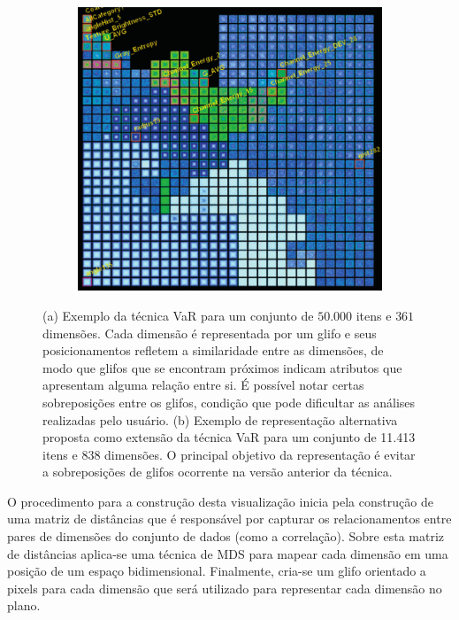 \begin{figure}[h!]
\begin{subfigure}[b]{0.475\textwidth}
    \includegraphics[width=\textwidth]{images/var2.png}
    \caption{}
    \label{fig:var2}
  \end{subfigure}
  \caption[VaR: Value and Relation]{(a) Exemplo da técnica VaR para um conjunto de $50.000$ itens e $361$ dimensões. Cada dimensão é representada por um glifo e seus posicionamentos refletem a similaridade entre as dimensões, de modo que glifos que se encontram próximos indicam atributos que apresentam alguma relação entre si. É possível notar certas sobreposições entre os glifos, condição que pode dificultar as análises realizadas pelo usuário. (b) Exemplo de representação alternativa proposta como extensão da técnica VaR para um conjunto de 11.413 itens e 838 dimensões. O principal objetivo da representação é evitar a sobreposições de glifos ocorrente na versão anterior da técnica.}
\end{figure}

O procedimento para a construção desta visualização inicia pela construção de uma matriz de distâncias que é responsável por capturar os relacionamentos entre pares de dimensões do conjunto de dados (como a correlação). Sobre esta matriz de distâncias aplica-se uma técnica de MDS para mapear cada dimensão em uma posição de um espaço bidimensional. Finalmente, cria-se um glifo orientado a pixels para cada dimensão que será utilizado para representar cada dimensão no plano.


